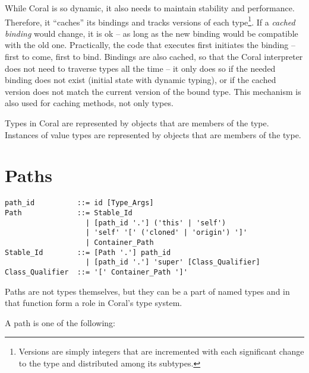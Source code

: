 While Coral is so dynamic, it also needs to maintain stability and performance. Therefore, it ``caches'' its bindings and tracks versions of each type\footnote{Versions are simply integers that are incremented with each significant change to the type and distributed among its subtypes.}. If a {\em cached binding} would change, it is ok -- as long as the new binding would be compatible with the old one. Practically, the code that executes first initiates the binding -- first to come, first to bind. Bindings are also cached, so that the Coral interpreter does not need to traverse types all the time -- it only does so if the needed binding does not exist (initial state with dynamic typing), or if the cached version does not match the current version of the bound type. This mechanism is also used for caching methods, not only types.

Types in Coral are represented by objects that are members of the  type. Instances of value types are represented by objects that are members of the  type. 






\section{Paths}
\label{sec:type-paths}

\syntax\begin{lstlisting}
path_id          ::= id [Type_Args]
Path             ::= Stable_Id
                   | [path_id '.'] ('this' | 'self')
                   | 'self' '[' ('cloned' | 'origin') ']'
                   | Container_Path
Stable_Id        ::= [Path '.'] path_id
                   | [path_id '.'] 'super' [Class_Qualifier]
Class_Qualifier  ::= '[' Container_Path ']'
\end{lstlisting}

Paths are not types themselves, but they can be a part of named types and in that function form a role in Coral's type system. 

A path is one of the following:

